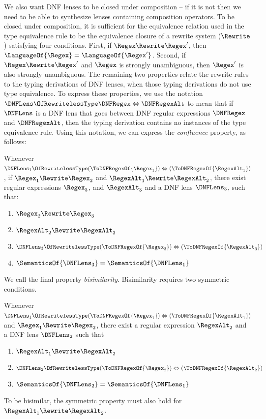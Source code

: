 \documentclass[sigplan,acmsmall]{acmart}
\begin{document}
We also want DNF lenses to be closed under composition -- if it is not then we
need to be able to synthesize lenses containing composition operators.  To be
closed under composition, it is sufficient
for the equivalence relation used in the type equivalence rule
to be the equivalence closure of a rewrite system ($\Rewrite$) satisfying
four conditions.
First, if $\Regex \Rewrite \Regex'$, then $\LanguageOf{\Regex} =
\LanguageOf{\Regex'}$.
Second, if $\Regex \Rewrite \Regex'$ and $\Regex$ is strongly unambiguous, then
$\Regex'$ is also strongly unambiguous.
The remaining two properties relate the rewrite rules to the typing derivations
of DNF lenses, when those typing derivations do not use type
equivalence.
To express these properties, 
we use the notation
$\DNFLens \OfRewritelessType \DNFRegex \Leftrightarrow \DNFRegexAlt$
to mean that
if $\DNFLens$ is a DNF lens that
goes between DNF regular expressions $\DNFRegex$ and $\DNFRegexAlt$, then the
typing derivation contains no instances of the type equivalence rule.
Using this notation, we can express the \textit{confluence} property, as
follows:
% 
\begin{definition}[Confluence]
  Whenever $\DNFLens_1 \OfRewritelessType (\ToDNFRegexOf{\Regex_1}) \Leftrightarrow
  (\ToDNFRegexOf{\RegexAlt_1})$,
  if $\Regex_1 \Rewrite
  \Regex_2$ and $\RegexAlt_1 \Rewrite \RegexAlt_2$, there exist regular
  expressions $\Regex_3$, and
  $\RegexAlt_3$ and a DNF lens $\DNFLens_3$, such that:
  \begin{enumerate}
  \item $\Regex_2 \Rewrite \Regex_3$
  \item $\RegexAlt_2 \Rewrite \RegexAlt_3$
  \item $\DNFLens_3 \OfRewritelessType (\ToDNFRegexOf{\Regex_3}) \Leftrightarrow
    (\ToDNFRegexOf{\RegexAlt_3})$
  \item $\SemanticsOf{\DNFLens_3} = \SemanticsOf{\DNFLens_1}$
  \end{enumerate}
\end{definition}
%
We call the final property \textit{bisimilarity}.  Bisimilarity requires two
symmetric conditions.
%
\begin{definition}[Bisimilarity]
  Whenever $\DNFLens_1 \OfRewritelessType (\ToDNFRegexOf{\Regex_1}) \Leftrightarrow
  (\ToDNFRegexOf{\RegexAlt_1})$ and 
  $\Regex_1 \Rewrite \Regex_2$, there exist a regular expression $\RegexAlt_2$ and a
  DNF lens $\DNFLens_2$ such that
  \begin{enumerate}
  \item $\RegexAlt_1 \Rewrite \RegexAlt_2$
  \item $\DNFLens_2 \OfRewritelessType (\ToDNFRegexOf{\Regex_2}) \Leftrightarrow
    (\ToDNFRegexOf{\RegexAlt_2})$
  \item $\SemanticsOf{\DNFLens_2} = \SemanticsOf{\DNFLens_1}$
  \end{enumerate}
  To be bisimilar, the symmetric property must also hold for $\RegexAlt_1 \Rewrite
  \RegexAlt_2$.
\end{definition}
\end{document}
